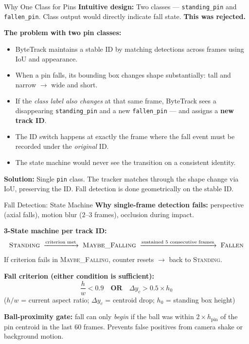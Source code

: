 \documentclass[aspectratio=169,10pt]{beamer}
\begin{document}
\begin{frame}{Why One Class for Pins}
  \textbf{Intuitive design:} Two classes --- \texttt{standing\_pin} and \texttt{fallen\_pin}.
  Class output would directly indicate fall state. \textbf{This was rejected.}

  \vspace{0.8em}
  \textbf{The problem with two pin classes:}
  \begin{itemize}
    \item ByteTrack maintains a stable ID by matching detections across frames using IoU and appearance.
    \item When a pin falls, its bounding box changes shape substantially: tall and narrow $\to$ wide and short.
    \item If the \emph{class label also changes} at that same frame, ByteTrack sees a disappearing \texttt{standing\_pin} and a new \texttt{fallen\_pin} --- and assigns a \textbf{new track ID}.
    \item The ID switch happens at exactly the frame where the fall event must be recorded under the \emph{original} ID.
    \item The state machine would never see the transition on a consistent identity.
  \end{itemize}

  \vspace{0.5em}
  \textbf{Solution:} Single \texttt{pin} class. The tracker matches through the shape change via IoU, preserving the ID. Fall detection is done geometrically on the stable ID.
\end{frame}

\begin{frame}{Fall Detection: State Machine}
  \textbf{Why single-frame detection fails:} perspective (axial falls), motion blur ($2$--$3$ frames), occlusion during impact.

  \vspace{0.5em}
  \textbf{3-State machine per track ID:}
  \[
    \textsc{Standing}
    \;\xrightarrow{\text{criterion met}}\;
    \textsc{Maybe\_Falling}
    \;\xrightarrow{\text{sustained 5 consecutive frames}}\;
    \textsc{Fallen}
  \]
  If criterion fails in \textsc{Maybe\_Falling}, counter resets $\to$ back to \textsc{Standing}.

  \vspace{0.5em}
  \textbf{Fall criterion (either condition is sufficient):}
  \[
    \frac{h}{w} < 0.9 \quad\textbf{OR}\quad \Delta y_c > 0.5 \times h_0
  \]
  ($h/w$ = current aspect ratio; $\Delta y_c$ = centroid drop; $h_0$ = standing box height)

  \vspace{0.5em}
  \textbf{Ball-proximity gate:} fall can only \emph{begin} if the ball was within $2 \times h_{\mathrm{pin}}$ of the pin centroid in the last 60 frames. Prevents false positives from camera shake or background motion.
\end{frame}
\end{document}
